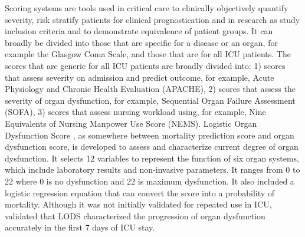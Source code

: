 \documentclass[12pt,a4paper,english
]{tunithesis}
\begin{document}
Scoring systems are tools used in critical care to clinically objectively quantify severity, risk stratify patients for clinical prognostication and in research as study inclusion criteria and to demonstrate equivalence of patient groups. It can broadly be divided into those that are specific for a disease or an organ, for example the Glasgow Coma Scale, and those that are for all ICU patients. The scores that are generic for all ICU patients are broadly divided into: 1) scores that assess severity on admission and predict outcome, for example, Acute Physiology and Chronic Health Evaluation (APACHE), 2) scores that assess the severity of organ dysfunction, for example, Sequential Organ Failure Assessment (SOFA), 3) scores that assess nursing workload using, for example, Nine Equivalents of Nursing Manpower Use Score (NEMS). \parencite{Tiffany21, Jonathan2008, Rapsang2014, Vincent2010} Logistic Organ Dysfunction Score \parencite{legall96}, as somewhere between mortality prediction score and organ dysfunction score, is developed to assess and characterize current degree of organ dysfunction. \parencite{Tiffany21, Vincent2010} It selects 12 variables to represent the function of six organ systems, which include laboratory results and non-invasive parameters. It ranges from 0 to 22 where 0 is no dysfunction and 22 is maximum dysfunction. It also included a logistic regression equation that can convert the score into a probability of mortality. Although it was not initially validated for repeated use in ICU, \textcite{Timsit2002} validated that LODS characterized the progression of organ dysfunction accurately in the first 7 days of ICU stay.
\end{document}
